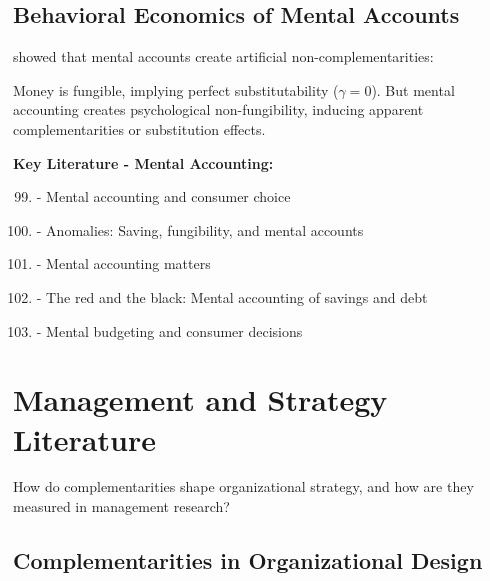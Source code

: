 \subsection{Behavioral Economics of Mental Accounts}
\label{subsec:mental-accounts}

\citet{thaler1985} showed that mental accounts create artificial non-complementarities:

\begin{finding}
Money is fungible, implying perfect substitutability ($\gamma = 0$). But mental accounting creates psychological non-fungibility, inducing apparent complementarities or substitution effects.
\end{finding}

\textbf{Key Literature - Mental Accounting:}
\begin{enumerate}[noitemsep]
    \setcounter{enumi}{98}
    \item \citet{thaler1985} - Mental accounting and consumer choice
    \item \citet{thaler1990} - Anomalies: Saving, fungibility, and mental accounts
    \item \citet{thaler1999} - Mental accounting matters
    \item \citet{prelec1998} - The red and the black: Mental accounting of savings and debt
    \item \citet{heath1995} - Mental budgeting and consumer decisions
\end{enumerate}

\section{Management and Strategy Literature}
\label{sec:management}

\begin{tcolorbox}[colback=yellow!5!white,colframe=yellow!75!black,title=\textbf{Fundamental Question}]
How do complementarities shape organizational strategy, and how are they measured in management research?
\end{tcolorbox}

\subsection{Complementarities in Organizational Design}
\label{subsec:org-design}


